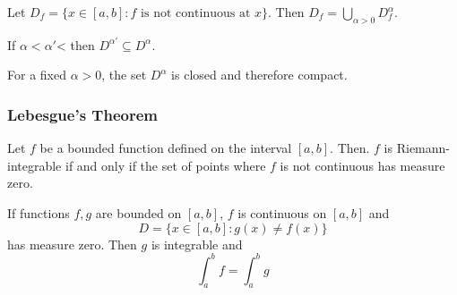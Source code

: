 \documentclass[11pt]{article}
\begin{document}
\fact Let $D_f =  \{x \in [a,b]: f \text{ is not continuous at $x$}\}$. Then $D_f = \bigcup_{\alpha > 0} D_f^\alpha$.

\fact If $\alpha < \alpha'$< then $D^{\alpha'} \subseteq D^\alpha$.

\fact For a fixed $\alpha > 0$, the set $D^\alpha$ is closed and therefore compact.

\subsubsection{Lebesgue's Theorem}
 Let $f$ be a bounded function defined on the interval $[a,b]$. Then. $f$ is Riemann-integrable if and only if the set of points where $f$ is not continuous has measure zero.

\corollary If functions $f, g$ are bounded on $[a,b]$, $f$ is continuous on $[a,b]$ and 
$$D = \{x \in [a,b]: g(x) \neq f(x)\}$$ has measure zero. Then $g$ is integrable and 
$$\int_a^b f = \int_a^b g$$
\end{document}
